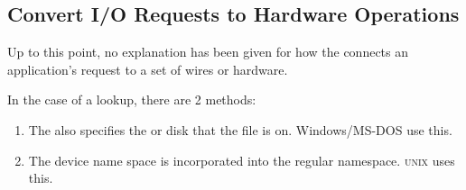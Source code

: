 \subsection{Convert I/O Requests to Hardware Operations}\label{subsec:Convert_IO_Requests_HW_Ops}
Up to this point, no explanation has been given for how the  connects an application's request to a set of wires or hardware.

In the case of a  lookup, there are 2 methods:
\begin{enumerate}[noitemsep]
\item The  also specifies the  or disk that the file is on.
  Windows/MS-DOS use this.
\item The device name space is incorporated into the regular  namespace.
  \textsc{unix} uses this.
\end{enumerate}


